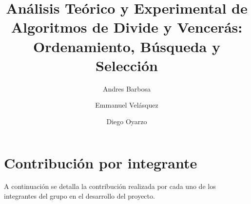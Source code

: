 \documentclass[9pt,letterpaper,onecolumn]{rho-class/rho}
\title{Análisis Teórico y Experimental de Algoritmos de Divide y Vencerás: Ordenamiento, Búsqueda y Selección}
\author[$\dagger$]{Andres Barbosa}
\author[$\dagger$]{Emmanuel Velásquez}
\author[$\dagger$]{Diego Oyarzo}
\affil[$\dagger$]{Universidad de Magallanes}
\begin{document}
\maketitle
\thispagestyle{firststyle}
\tableofcontents

\newpage


\newpage

\newpage

\newpage

\newpage
\section{Contribución por integrante}
A continuación se detalla la contribución realizada por cada uno de los integrantes del grupo en el desarrollo del proyecto.



\newpage


\newpage
\nocite{*}
\printbibliography
\end{document}
